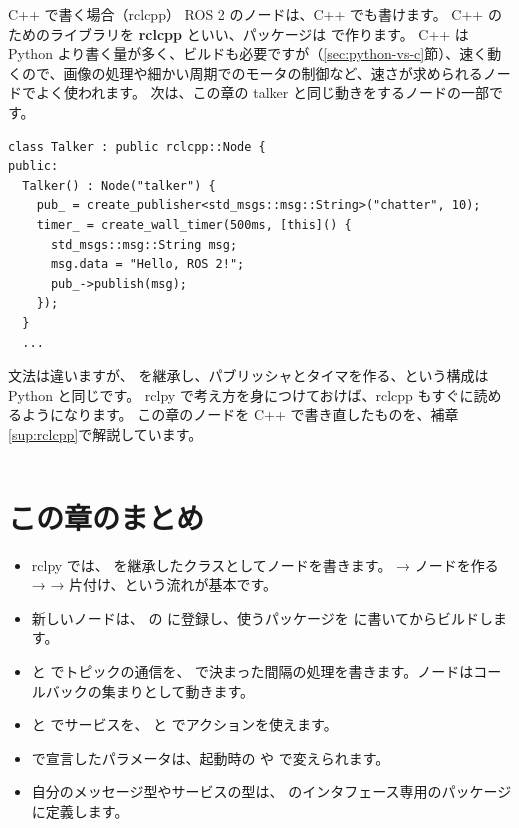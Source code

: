 \begin{column}{C++ で書く場合（rclcpp）}
  ROS 2 のノードは、C++ でも書けます。
  C++ のためのライブラリを \textbf{rclcpp} といい、パッケージは  で作ります。
  C++ は Python より書く量が多く、ビルドも必要ですが（\ref{sec:python-vs-c}節）、速く動くので、画像の処理や細かい周期でのモータの制御など、速さが求められるノードでよく使われます。
  次は、この章の talker と同じ動きをするノードの一部です。
\begin{lstlisting}[style=cpp, numbers=none, xleftmargin=0pt, framexleftmargin=0pt]
class Talker : public rclcpp::Node {
public:
  Talker() : Node("talker") {
    pub_ = create_publisher<std_msgs::msg::String>("chatter", 10);
    timer_ = create_wall_timer(500ms, [this]() {
      std_msgs::msg::String msg;
      msg.data = "Hello, ROS 2!";
      pub_->publish(msg);
    });
  }
  ...
\end{lstlisting}
  文法は違いますが、 を継承し、パブリッシャとタイマを作る、という構成は Python と同じです。
  rclpy で考え方を身につけておけば、rclcpp もすぐに読めるようになります。
  この章のノードを C++ で書き直したものを、補章\ref{sup:rclcpp}で解説しています。
\end{column}

\section*{この章のまとめ}

\begin{itemize}
  \item rclpy では、 を継承したクラスとしてノードを書きます。 → ノードを作る →  → 片付け、という流れが基本です。
  \item 新しいノードは、 の  に登録し、使うパッケージを  に書いてからビルドします。
  \item {} と  でトピックの通信を、 で決まった間隔の処理を書きます。ノードはコールバックの集まりとして動きます。
  \item {} と  でサービスを、 と  でアクションを使えます。
  \item {} で宣言したパラメータは、起動時の  や  で変えられます。
  \item 自分のメッセージ型やサービスの型は、 のインタフェース専用のパッケージに定義します。
\end{itemize}
